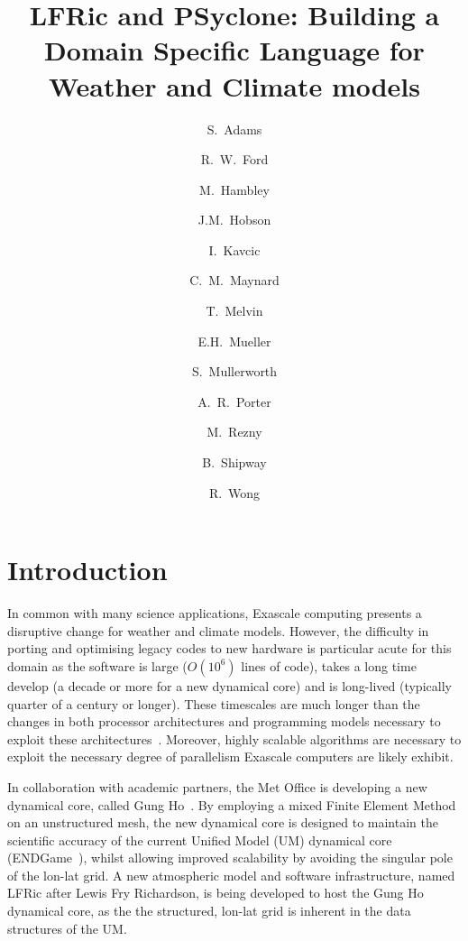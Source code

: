 \documentclass[times]{elsarticle}
\begin{document}
\begin{frontmatter}

\title{LFRic and PSyclone: Building a Domain Specific Language for Weather and Climate models}

\author[met]{S.~Adams}
\author[hartree]{R.~W.~Ford}
\author[met]{M.~Hambley}
\author[met]{J.M.~Hobson}
\author[met]{I.~Kavcic}
\author[met,read]{C.~M.~Maynard}
\author[met]{T.~Melvin}
\author[bath]{E.H.~Mueller}
\author[met]{S.~Mullerworth}
\author[hartree]{A.~R.~Porter}
\author[downunder]{M.~Rezny}
\author[met]{B.~Shipway}
\author[met]{R.~Wong}




\address[met]{Met Office, FitzRoy Road, Exeter, EX1 3PB}
\address[hartree]{Hartree Centre, STFC Daresbury, Grim up North}
\address[read]{Department of Computer Science, Polly Vacher Building,
  University of Reading, Reading, UK, RG6 6AY}
\address[bath]{Department of Mathematics, University of Bath, Bath}
\address[downunder]{Monash University, Melbourne, Australia}

\begin{abstract}
\end{abstract}

\begin{keyword}

\end{keyword}

\end{frontmatter}

\section{Introduction}
In common with many science applications, Exascale computing presents
a disruptive change for weather and climate models. However, the
difficulty in porting and optimising legacy codes to new hardware is
particular acute for this domain as the software is large ($O(10^6)$
lines of code), takes a long time develop (a decade or more for a new
dynamical core) and is long-lived (typically quarter of a century or longer). These
timescales are much longer than the changes in both processor
architectures and programming models necessary to exploit these
architectures~\cite{gmd-2017-186}. Moreover, highly scalable
algorithms are necessary to exploit the necessary degree of
parallelism Exascale computers are likely exhibit.

In collaboration with academic partners, the Met Office is developing
a new dynamical core, called Gung Ho~\cite{MELVIN2018342}. By
employing a mixed Finite Element Method on an unstructured mesh, the
new dynamical core is designed to maintain the scientific accuracy of
the current Unified Model (UM) dynamical core (ENDGame~\cite{QJ:QJ2235}),
whilst allowing improved scalability by avoiding the singular pole of
the lon-lat grid. A new atmospheric model and software infrastructure,
named LFRic after Lewis Fry Richardson, is being developed to host the
Gung Ho dynamical core, as the the structured, lon-lat grid is inherent in the
data structures of the UM.
\end{document}
